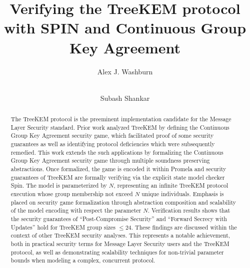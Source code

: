 \documentclass[runningheads]{llncs}
\begin{document}
	\title{Verifying the TreeKEM protocol with SPIN and Continuous Group Key Agreement}
	\author{Alex J. Washburn \and\\
		Subash Shankar}
	
	\maketitle              %
	\begin{abstract}
		The TreeKEM protocol is the preeminent implementation candidate for the Message Layer Security standard.
		Prior work analyzed TreeKEM by defining the Continuous Group Key Agreement security game,
		which facilitated proof of some security guarantees as well as identifying protocol deficiencies which were subsequently remedied.
		This work extends the such applications by formalizing the Continuous Group Key Agreement security game through multiple  soundness preserving abstractions.
		Once formalized, the game is encoded it within Promela and security guarantees of TreeKEM are formally verifying via the explicit state model checker Spin.
		The model is parameterized by $N$, representing an infinite TreeKEM protocol execution whose group membership not exceed $N$ unique individuals.
		Emphasis is placed on security game formalization through abstraction composition and scalability of the model encoding with respect the parameter $N$.
		Verification results shows that the security guarantees of ``Post-Compromise Security'' and ``Forward Secrecy with Updates'' hold for TreeKEM group sizes $\le 24$.
		These findings are discussed within the context of other TreeKEM security analyses.
		This represents a notable achievement, both in practical security terms for Message Layer Security users and the TreeKEM protocol, as well as demonstrating scalability techniques for non-trivial parameter bounds when modeling a complex, concurrent protocol.
		
	\end{abstract}
	
	
\end{document}
